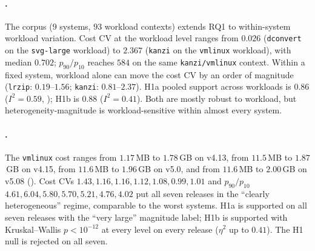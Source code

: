 \paragraph*{\StudyWorkload.}
The \dsWLI corpus ($9$ systems, $93$ workload contexts)
extends RQ1 to within-system workload variation. Cost CV at the
workload level ranges from $0.026$ (\texttt{dconvert} on the
\texttt{svg-large} workload) to $2.367$ (\texttt{kanzi} on the
\texttt{vmlinux} workload), with median $0.702$;
$p_{90}/p_{10}$ reaches $584$ on the same \texttt{kanzi/vmlinux}
context. Within a fixed system, workload alone can move the cost CV
by an order of magnitude
(\eg \texttt{lrzip}: $0.19$--$1.56$;
\texttt{kanzi}: $0.81$--$2.37$).
H1a pooled support across workloads is $0.86$
($I^{2}\!=\!0.59$, ); H1b is $0.88$
($I^{2}\!=\!0.41$). Both are mostly robust to workload, but
heterogeneity-magnitude is workload-sensitive within almost every
system.

\paragraph*{\StudyLinux.}
The \texttt{vmlinux} cost ranges from $1.17$\,MB to $1.78$\,GB on
v4.13, from $11.5$\,MB to $1.87$\,GB on v4.15, from $11.6$\,MB to
$1.96$\,GB on v5.0, and from $11.6$\,MB to $2.00$\,GB on v5.08
(). Cost CVs $1.43, 1.16, 1.16, 1.12, 1.08, 0.99, 1.01$ and
$p_{90}/p_{10}$ $4.61, 6.04, 5.80, 5.70, 5.21, 4.76, 4.02$ put all seven releases in the
``clearly heterogeneous'' regime, comparable to the worst \StudyReplication
systems. H1a is supported on all seven releases with the ``very
large'' magnitude label; H1b is supported with Kruskal--Wallis
$p<\!10^{-12}$ at every level on every release ($\eta^{2}$ up to
$0.41$). The H1 null is rejected on all seven.


